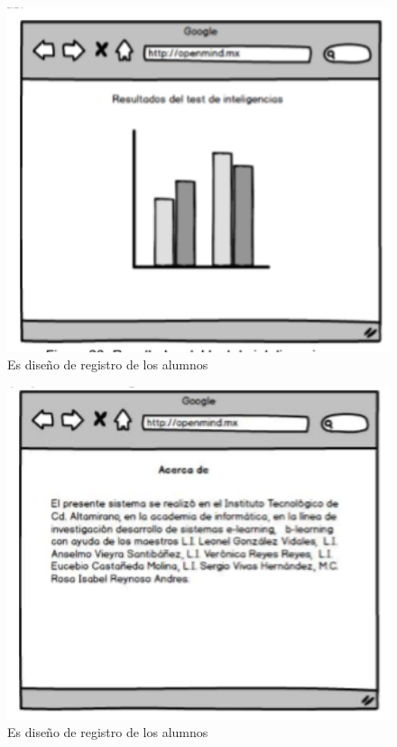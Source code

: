\documentclass[letterpaper,oneside,openany,11pt]{book}
\begin{document}
 \begin{figure}[H]
	\centering
	\includegraphics[width=1.0\textwidth]{./Imagenes/43}
	\caption{Es diseño de registro de los alumnos}
\end{figure}

 \begin{figure}[H]
	\centering
	\includegraphics[width=1.0\textwidth]{./Imagenes/44}
	\caption{Es diseño de registro de los alumnos}
\end{figure}
\end{document}
